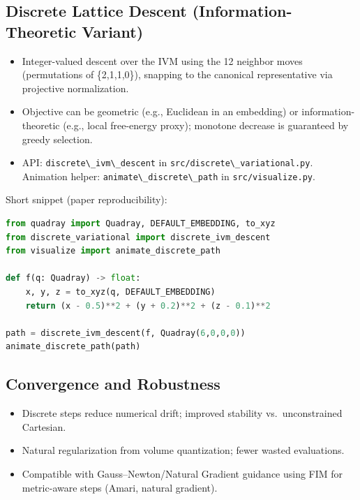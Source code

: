 \documentclass[
  10pt,
]{article}
\newcommand{\passthrough}[1]{#1}
\providecommand{\tightlist}{%
  \setlength{\itemsep}{0pt}\setlength{\parskip}{0pt}}
\begin{document}
\hypertarget{discrete-lattice-descent-information-theoretic-variant}{%
\subsection{Discrete Lattice Descent (Information-Theoretic
Variant)}\label{discrete-lattice-descent-information-theoretic-variant}}

\begin{itemize}
\tightlist
\item
  Integer-valued descent over the IVM using the 12 neighbor moves
  (permutations of \{2,1,1,0\}), snapping to the canonical
  representative via projective normalization.
\item
  Objective can be geometric (e.g., Euclidean in an embedding) or
  information-theoretic (e.g., local free-energy proxy); monotone
  decrease is guaranteed by greedy selection.
\item
  API: \passthrough{\lstinline!discrete\_ivm\_descent!} in
  \passthrough{\lstinline!src/discrete\_variational.py!}. Animation
  helper: \passthrough{\lstinline!animate\_discrete\_path!} in
  \passthrough{\lstinline!src/visualize.py!}.
\end{itemize}

Short snippet (paper reproducibility):

\begin{lstlisting}[language=Python]
from quadray import Quadray, DEFAULT_EMBEDDING, to_xyz
from discrete_variational import discrete_ivm_descent
from visualize import animate_discrete_path

def f(q: Quadray) -> float:
    x, y, z = to_xyz(q, DEFAULT_EMBEDDING)
    return (x - 0.5)**2 + (y + 0.2)**2 + (z - 0.1)**2

path = discrete_ivm_descent(f, Quadray(6,0,0,0))
animate_discrete_path(path)
\end{lstlisting}

\hypertarget{convergence-and-robustness}{%
\subsection{Convergence and
Robustness}\label{convergence-and-robustness}}

\begin{itemize}
\tightlist
\item
  Discrete steps reduce numerical drift; improved stability
  vs.~unconstrained Cartesian.
\item
  Natural regularization from volume quantization; fewer wasted
  evaluations.
\item
  Compatible with Gauss--Newton/Natural Gradient guidance using FIM for
  metric-aware steps (Amari, natural gradient).
\end{itemize}
\end{document}
